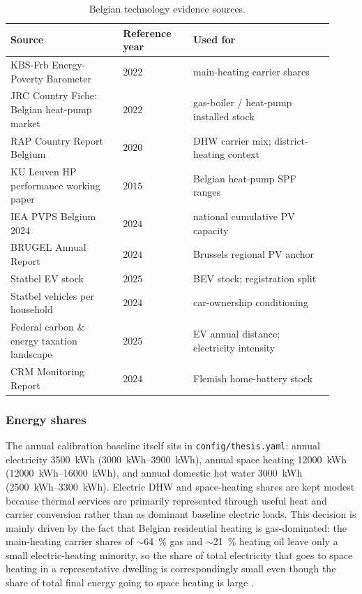 \begin{table}[ht]
  \centering
  \footnotesize
  \caption{Belgian technology evidence sources.}
  \label{tab:belgian_tech_sources}
  \begin{tabular}{@{}p{0.32\linewidth} p{0.20\linewidth} p{0.40\linewidth}@{}}
    \toprule
    \textbf{Source} & \textbf{Reference year} & \textbf{Used for} \\
    \midrule
    KBS-Frb Energy-Poverty Barometer \cite{KBSFrb2024}
      & $2022$ & main-heating carrier shares \\
    JRC Country Fiche: Belgian heat-pump market \cite{JRC2022HeatPumpBelgium}
      & $2022$ & gas-boiler / heat-pump installed stock \\
    RAP Country Report Belgium \cite{RAP2020BelgiumReport}
      & $2020$ & DHW carrier mix; district-heating context \\
    KU Leuven HP performance working paper \cite{KULeuvenHP2015}
      & $2015$ & Belgian heat-pump SPF ranges \\
    IEA PVPS Belgium 2024 \cite{IEAPVPS2024Belgium}
      & $2024$ & national cumulative PV capacity \\
    BRUGEL Annual Report \cite{Brugel2024Annual}
      & $2024$ & Brussels regional PV anchor \\
    Statbel EV stock \cite{Statbel2025EV}
      & $2025$ & BEV stock; registration split \\
    Statbel vehicles per household \cite{Statbel2024VehiclesHousehold}
      & $2024$ & car-ownership conditioning \\
    Federal carbon \& energy taxation landscape \cite{Climat2025Taxation}
      & $2025$ & EV annual distance; electricity intensity \\
    CRM Monitoring Report \cite{CRM2025Monitoring}
      & $2024$ & Flemish home-battery stock \\
    \bottomrule
  \end{tabular}
\end{table}

\subsubsection*{Energy shares}
The annual calibration baseline itself sits in \texttt{config/thesis.yaml}: annual electricity \SI{3500}{kWh} (\SIrange{3000}{3900}{kWh}), annual space heating \SI{12000}{kWh} (\SIrange{12000}{16000}{kWh}), and annual domestic hot water \SI{3000}{kWh} (\SIrange{2500}{3300}{kWh}). Electric DHW and space-heating shares are kept modest because thermal services are primarily represented through useful heat and carrier conversion rather than as dominant baseline electric loads. This decision is mainly driven by the fact that Belgian residential heating is gas-dominated: the main-heating carrier shares of $\sim$\SI{64}{\percent} gas and $\sim$\SI{21}{\percent} heating oil \cite{KBSFrb2024,JRC2022HeatPumpBelgium} leave only a small electric-heating minority, so the share of total electricity that goes to space heating in a representative dwelling is correspondingly small even though the share of total final energy going to space heating is large \cite{eurostat_disaggregated_nodate}.


